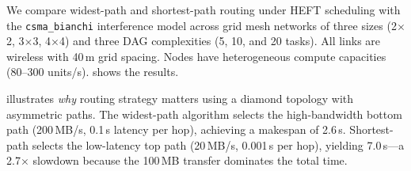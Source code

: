 \documentclass[conference]{IEEEtran}
\begin{document}
We compare widest-path and shortest-path routing under HEFT scheduling with
the \texttt{csma\_bianchi} interference model across grid mesh networks of
three sizes (2$\times$2, 3$\times$3, 4$\times$4) and three DAG complexities
(5, 10, and 20 tasks).  All links are wireless with 40\,m grid spacing.
Nodes have heterogeneous compute capacities (80--300 units/s).
 shows the results.

 illustrates \emph{why} routing strategy matters
using a diamond topology with asymmetric paths.  The widest-path algorithm
selects the high-bandwidth bottom path (200\,MB/s, 0.1\,s latency per hop),
achieving a makespan of 2.6\,s.  Shortest-path selects the low-latency top
path (20\,MB/s, 0.001\,s per hop), yielding 7.0\,s---a 2.7$\times$ slowdown
because the 100\,MB transfer dominates the total time.
\end{document}
